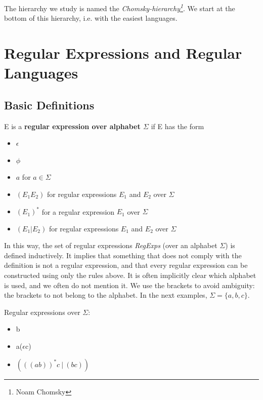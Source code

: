 The hierarchy we study is named the {\em
Chomsky-hierarchy\footnote{Noam Chomsky}}. We start at the bottom of
this hierarchy, i.e. with the easiest languages.



\chapter{Regular Expressions and Regular Languages}

\section{Basic Definitions}

\begin{definition} \label{defregexp}
E is a {\bf regular expression over alphabet $\Sigma$} if E has the form
\begin{itemize}
\item $\epsilon$
\item $\phi$
\item $a$ for $a \in \Sigma$
\item $(E_1E_2)$ for regular expressions $E_1$ and $E_2$ over $\Sigma$
\item $(E_1)^*$ for a regular expression $E_1$ over $\Sigma$
\item $(E_1 | E_2)$ for regular expressions $E_1$ and $E_2$ over $\Sigma$
\end{itemize}
\end{definition}

In this way, the set of regular expressions {\em RegExps} (over an
alphabet $\Sigma$) is defined inductively. It implies that something
that does not comply with the definition is not a regular expression,
and that every regular expression can be constructed using only the
rules above.
%
It is often implicitly clear which alphabet is used, and we often do
not mention it.
%
We use the brackets to avoid ambiguity: the brackets to not belong to
the alphabet.
%
In the next examples, $\Sigma = \{a,b,c\}$.

\begin{example}
Regular expressions over $\Sigma$:
\begin{itemize}
\item b
\item a($\epsilon$c)
\item $(((ab))^*c~|~(bc))$
\end{itemize}
\end{example}

